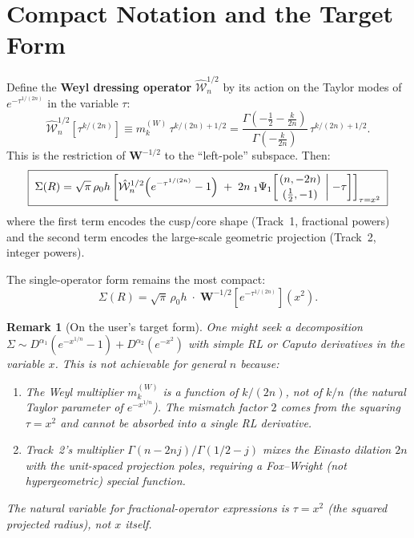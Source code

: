 \documentclass{article}
\newtheorem{remark}{Remark}
\begin{document}
\section{Compact Notation and the Target Form}
\label{sec:compact}

Define the \textbf{Weyl dressing operator} $\hat{\mathcal{W}}^{1/2}_n$ by its
action on the Taylor modes of $e^{-\tau^{1/(2n)}}$ in the variable $\tau$:
\begin{equation}
\hat{\mathcal{W}}^{1/2}_n\!\left[\tau^{k/(2n)}\right]
\equiv m_k^{(W)}\,\tau^{k/(2n)+1/2}
= \frac{\Gamma(-\frac12-\frac{k}{2n})}{\Gamma(-\frac{k}{2n})}\,\tau^{k/(2n)+1/2}.
\end{equation}
This is the restriction of $\mathbf{W}^{-1/2}$ to the ``left-pole'' subspace.
Then:
\begin{equation}\label{eq:compact}
\boxed{\;
\Sigma(R) = \sqrt\pi\,\rho_0 h\left[
\hat{\mathcal{W}}^{1/2}_n\!\left(e^{-\tau^{1/(2n)}}-1\right)
\;+\; 2n\;{}_1\Psi_1\!\left[
\genfrac{}{}{0pt}{}{(n,-2n)}{(\frac12,-1)}
\;\bigg|\;{-}\tau\right]
\right]_{\tau=x^2}
\;}
\end{equation}
where the first term encodes the cusp/core shape (Track~1, fractional powers)
and the second term encodes the large-scale geometric projection (Track~2,
integer powers).

The single-operator form remains the most compact:
\begin{equation}\label{eq:most-compact}
\Sigma(R) = \sqrt\pi\,\rho_0 h\;\cdot\;\mathbf{W}^{-1/2}\!\left[e^{-\tau^{1/(2n)}}\right]\!(x^2).
\end{equation}

\begin{remark}[On the user's target form]
One might seek a decomposition
$\Sigma \sim D^{\alpha_1}(e^{-x^{1/n}}-1) + D^{\alpha_2}(e^{-x^{2}})$
with simple RL or Caputo derivatives in the variable $x$. This is not achievable
for general $n$ because:
\begin{enumerate}
\item The Weyl multiplier $m_k^{(W)}$ is a function of $k/(2n)$, not of $k/n$
  (the natural Taylor parameter of $e^{-x^{1/n}}$). The mismatch factor $2$
  comes from the squaring $\tau=x^2$ and cannot be absorbed into a single RL
  derivative.
\item Track~2's multiplier $\Gamma(n-2nj)/\Gamma(1/2-j)$ mixes the Einasto
  dilation $2n$ with the unit-spaced projection poles, requiring a Fox--Wright
  (not hypergeometric) special function.
\end{enumerate}
The natural variable for fractional-operator expressions is $\tau=x^2$
(the squared projected radius), not $x$ itself.
\end{remark}
\end{document}
